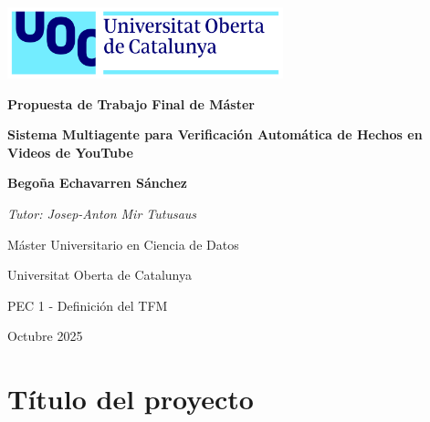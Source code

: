 \documentclass[12pt,a4paper]{article}
\begin{document}
\begin{titlepage}
    \begin{center}
    \vspace*{0.5cm}

    \includegraphics[width=0.6\textwidth]{figs/uoc_logo.png}

    \vspace{1.5cm}

    {\Huge \textbf{Propuesta de Trabajo Final de Máster}}

    \vspace{2cm}

    {\LARGE \textbf{Sistema Multiagente para Verificación Automática de Hechos en Videos de YouTube}}

    \vspace{2.5cm}

    \textbf{\large Begoña Echavarren Sánchez}

    \vspace{0.5cm}

    \textit{Tutor: Josep-Anton Mir Tutusaus}

    \vspace{2cm}

    {\large Máster Universitario en Ciencia de Datos}

    {\large Universitat Oberta de Catalunya}

    \vspace{1cm}

    {\large PEC 1 - Definición del TFM}

    \vspace{0.5cm}

    {\large Octubre 2025}

    \end{center}
\end{titlepage}

\newpage
{}

\hypersetup{linkcolor=black}
\tableofcontents
\hypersetup{linkcolor=blue}

\newpage

\section{Título del proyecto}
\end{document}
